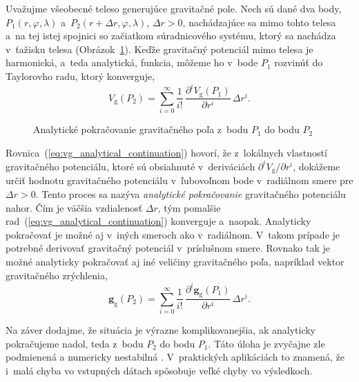 \documentclass[a4paper,12pt]{book}
\newcommand{\gidx}{\mathrm g}
\let\vec\mathbf
\begin{document}
Uvažujme všeobecné teleso generujúce gravitačné pole.  Nech sú dané dva body,
$P_1(r, \varphi, \lambda)$ a~$P_2(r + \Delta r, \varphi, \lambda)$, $\Delta
r > 0$, nachádzajúce sa mimo tohto telesa a~na tej istej spojnici so začiatkom
súradnicového systému, ktorý sa nachádza v~ťažisku telesa
(Obrázok~\ref{fig:analytical_continuation}).  Keďže gravitačný potenciál mimo
telesa je harmonická, a~teda analytická, funkcia, môžeme ho v~bode $P_1$
rozvinúť do Taylorovho radu, ktorý konverguje,
%
\begin{equation}
\label{eq:vg_analytical_continuation}
V_\gidx(P_2) = \sum_{i = 0}^\infty \frac{1}{i!} \, \frac{\partial^i
V_\gidx(P_1)}{\partial r^i} \, \Delta r^i{.}
\end{equation}

\begin{figure}
\centering

\caption{Analytické pokračovanie gravitačného poľa z~bodu $P_1$ do bodu $P_2$}
\label{fig:analytical_continuation}
\end{figure}

Rovnica~(\ref{eq:vg_analytical_continuation}) hovorí, že z~lokálnych vlastností
gravitačného potenciálu, ktoré sú obsiahnuté v~deriváciách $\partial^i V_\gidx
\slash \partial r^i$, dokážeme určiť hodnotu gravitačného potenciálu
v~ľubovoľnom bode v~radiálnom smere pre $\Delta r > 0$.  Tento proces sa nazýva
\emph{analytické pokračovanie} gravitačného potenciálu nahor.  Čím je väčšia
vzdialenosť $\Delta r$, tým pomalšie
rad~(\ref{eq:vg_analytical_continuation}) konverguje a~naopak.  Analyticky
pokračovať je možné aj v~iných smeroch ako v~radiálnom.  V~takom prípade je
potrebné derivovať gravitačný potenciál v~príslušnom smere.  Rovnako tak je
možné analyticky pokračovať aj iné veličiny gravitačného poľa, napríklad vektor
gravitačného zrýchlenia,
%
\begin{equation}
\vec g_\gidx(P_2) = \sum_{i = 0}^{\infty} \frac{1}{i!} \, \frac{\partial^i \vec
g_\gidx(P_1)}{\partial r^i} \, \Delta r^i{.}
\end{equation}

Na záver dodajme, že situácia je výrazne komplikovanejšia, ak analyticky 
pokračujeme nadol, teda z~bodu $P_2$ do bodu $P_1$.  Táto úloha je zvyčajne zle 
podmienená a numericky nestabilná \parencite{SansoGeodeticBoundaryValueProblem}.  
V~praktických aplikáciách to znamená, že i~malá chyba vo vstupných dátach 
spôsobuje veľké chyby vo výsledkoch.
\end{document}
